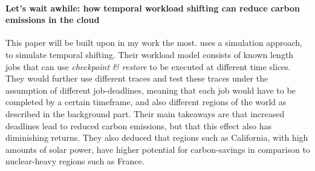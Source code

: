 \paragraph{Let's wait awhile: how temporal workload shifting can reduce carbon emissions in the cloud} This paper will be built upon in my work the most.
\cite{wiesner_lets_2021} uses a simulation approach, to simulate temporal shifting. Their workload model consists of known length jobs that can use \emph{checkpoint \& restore} to be executed at different time slices. 
They would further use different traces and test these traces under the assumption of different job-deadlines, meaning that each job would have to be completed by a certain timeframe, and also different regions of the world as described in the background part. 
Their main takeaways are that increased deadlines lead to reduced carbon emissions, but that this effect also has diminishing returns. 
They also deduced that regions such as California, with high amounts of solar power, have higher potential for carbon-savings in comparison to nuclear-heavy regions such as France.
